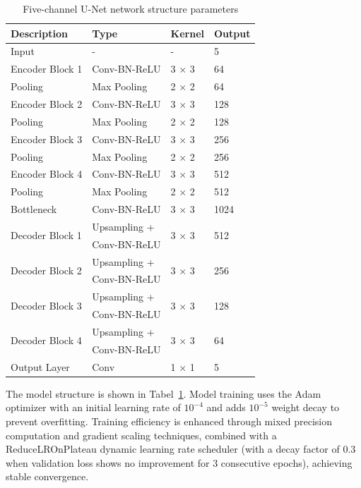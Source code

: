 \documentclass[12pt]{iopart}
\begin{document}
\begin{table}[htbp]
    \centering
    \caption{Five-channel U-Net network structure parameters}
    \label{tab:unet_architecture}
    \begin{tabular}{@{}p{4cm}p{4cm}p{3cm}p{3cm}@{}}
    \toprule
    \textbf{Description} & \textbf{Type} & \textbf{Kernel} & \textbf{Output} \\ \midrule
    Input & - & - & 5 \\
    Encoder Block 1 & Conv-BN-ReLU & 3 $\times$ 3 & 64 \\
    Pooling & Max Pooling & 2 $\times$ 2 & 64 \\
    Encoder Block 2 & Conv-BN-ReLU & 3 $\times$ 3 & 128 \\
    Pooling & Max Pooling & 2 $\times$ 2 & 128 \\
    Encoder Block 3 & Conv-BN-ReLU & 3 $\times$ 3 & 256 \\
    Pooling & Max Pooling & 2 $\times$ 2 & 256 \\
    Encoder Block 4 & Conv-BN-ReLU & 3 $\times$ 3 & 512 \\
    Pooling & Max Pooling & 2 $\times$ 2 & 512 \\
    Bottleneck & Conv-BN-ReLU & 3 $\times$ 3 & 1024 \\
    \multirow{2}{*}{Decoder Block 1} & Upsampling + & \multirow{2}{*}{3 $\times$ 3} & \multirow{2}{*}{512} \\
    & Conv-BN-ReLU & & \\
    \multirow{2}{*}{Decoder Block 2} & Upsampling + & \multirow{2}{*}{3 $\times$ 3} & \multirow{2}{*}{256} \\
    & Conv-BN-ReLU & & \\
    \multirow{2}{*}{Decoder Block 3} & Upsampling + & \multirow{2}{*}{3 $\times$ 3} & \multirow{2}{*}{128} \\
    & Conv-BN-ReLU & & \\
    \multirow{2}{*}{Decoder Block 4} & Upsampling + & \multirow{2}{*}{3 $\times$ 3} & \multirow{2}{*}{64} \\
    & Conv-BN-ReLU & & \\
    Output Layer & Conv & 1 $\times$ 1 & 5 \\ \bottomrule
    \end{tabular}
\end{table}

The model structure is shown in Tabel~\ref{tab:unet_architecture}.
Model training uses the Adam optimizer with an initial learning rate of $10^{-4}$ and adds   $10^{-5}$ weight decay to prevent overfitting. 
Training efficiency is enhanced through mixed precision computation and gradient scaling techniques, combined with a ReduceLROnPlateau dynamic learning rate scheduler (with a decay factor of 0.3 when validation loss shows no improvement for 3 consecutive epochs), achieving stable convergence.
\end{document}
